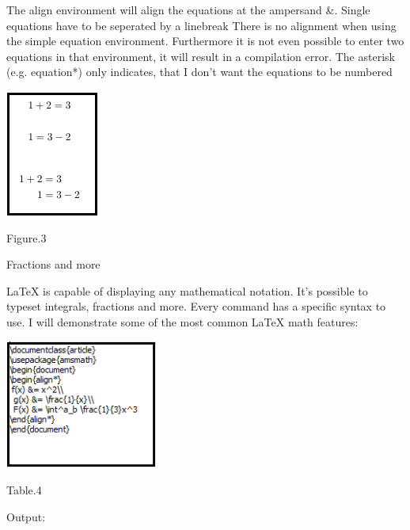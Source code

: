 \documentclass[onecolumn,journal] {IEEEtran}
\begin{document}
\begin{flushleft}
The align environment will align the equations at the ampersand \&. Single equations have to be seperated by a linebreak 
There is no alignment when using the simple equation environment. Furthermore it is not even possible to enter two equations in that environment, it will result in a compilation error. The asterisk (e.g. equation*) only indicates, that I don't want the equations 
to be numbered 
\end{flushleft}

\center

\includegraphics[width=4 cm]{dismat1.png}
\begin{center}
Figure.3
\newpage
\end{center} 
\begin{flushleft}
\begin{Large}
Fractions and more
\end{Large} 
\newline
\newline
LaTeX is capable of displaying any mathematical notation. It's possible to typeset integrals, fractions and more. Every command has a specific syntax to use. I will demonstrate some of the most common LaTeX math features:
\end{flushleft}
\center

\includegraphics[width=5cm]{codemat2ee.png}
\begin{center}
Table.4
\end{center} 
\begin{flushleft}
\begin{Large}
Output:
\end{Large}
\end{flushleft}
\end{document}
